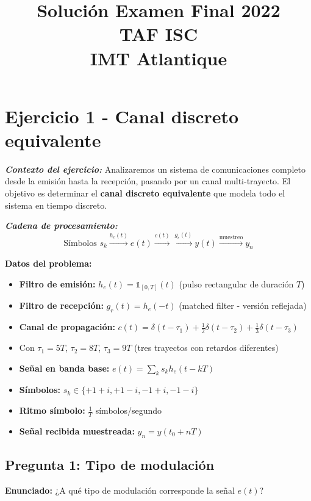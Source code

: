 \documentclass[11pt,a4paper]{article}
\title{\textbf{Soluci\'on Examen Final 2022\\TAF ISC\\IMT Atlantique}}
\author{}
\date{}
\begin{document}
\maketitle

\section*{Ejercicio 1 - Canal discreto equivalente}

\textit{\textbf{Contexto del ejercicio:}} Analizaremos un sistema de comunicaciones completo desde la emisión hasta la recepción, pasando por un canal multi-trayecto. El objetivo es determinar el \textbf{canal discreto equivalente} que modela todo el sistema en tiempo discreto.

\textit{\textbf{Cadena de procesamiento:}}
\[
\text{Símbolos } s_k \xrightarrow{h_e(t)} e(t) \xrightarrow{c(t)} \xrightarrow{g_r(t)} y(t) \xrightarrow{\text{muestreo}} y_n
\]

\textbf{Datos del problema:}

\begin{itemize}
    \item \textbf{Filtro de emisión:} $h_e(t) = \mathds{1}_{[0,T]}(t)$ (pulso rectangular de duración $T$)
    \item \textbf{Filtro de recepción:} $g_r(t) = h_e(-t)$ (matched filter - versión reflejada)
    \item \textbf{Canal de propagación:} $c(t) = \delta(t-\tau_1) + \frac{1}{2}\delta(t-\tau_2) + \frac{1}{3}\delta(t-\tau_3)$
    \item Con $\tau_1 = 5T$, $\tau_2 = 8T$, $\tau_3 = 9T$ (tres trayectos con retardos diferentes)
    \item \textbf{Señal en banda base:} $e(t) = \sum_k s_k h_e(t-kT)$
    \item \textbf{Símbolos:} $s_k \in \{+1+i, +1-i, -1+i, -1-i\}$
    \item \textbf{Ritmo símbolo:} $\frac{1}{T}$ símbolos/segundo
    \item \textbf{Señal recibida muestreada:} $y_n = y(t_0 + nT)$
\end{itemize}

\subsection*{Pregunta 1: Tipo de modulación}

\textbf{Enunciado:} ¿A qué tipo de modulación corresponde la señal $e(t)$?
\end{document}
